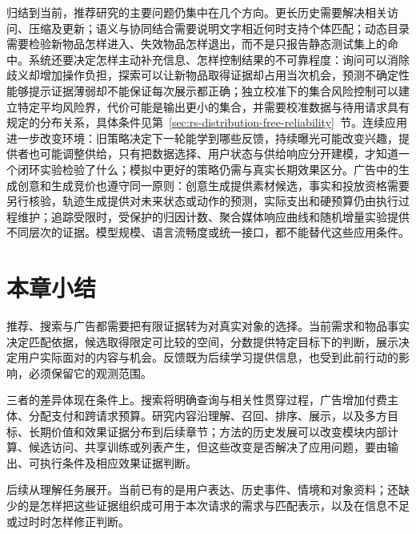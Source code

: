 归结到当前，推荐研究的主要问题仍集中在几个方向。更长历史需要解决相关访问、压缩及更新；语义与协同结合需要说明文字相近何时支持个体匹配；动态目录需要检验新物品怎样进入、失效物品怎样退出，而不是只报告静态测试集上的命中。系统还要决定怎样主动补充信息、怎样控制结果的不可靠程度：询问可以消除歧义却增加操作负担，探索可以让新物品取得证据却占用当次机会，预测不确定性能够提示证据薄弱却不能保证每次展示都正确；独立校准下的集合风险控制可以建立特定平均风险界，代价可能是输出更小的集合，并需要校准数据与待用请求具有规定的分布关系，具体条件见第~\ref{sec:rs-distribution-free-reliability}~节。连续应用进一步改变环境：旧策略决定下一轮能学到哪些反馈，持续曝光可能改变兴趣，提供者也可能调整供给，只有把数据选择、用户状态与供给响应分开建模，才知道一个闭环实验检验了什么；模拟中更好的策略仍需与真实长期效果区分。广告中的生成创意和生成竞价也遵守同一原则：创意生成提供素材候选，事实和投放资格需要另行核验，轨迹生成提供对未来状态或动作的预测，实际支出和硬预算仍由执行过程维护；追踪受限时，受保护的归因计数、聚合媒体响应曲线和随机增量实验提供不同层次的证据。模型规模、语言流畅度或统一接口，都不能替代这些应用条件。

\section{本章小结}
\label{sec:rs-overview-summary}

推荐、搜索与广告都需要把有限证据转为对真实对象的选择。当前需求和物品事实决定匹配依据，候选取得限定可比较的空间，分数提供特定目标下的判断，展示决定用户实际面对的内容与机会。反馈既为后续学习提供信息，也受到此前行动的影响，必须保留它的观测范围。

三者的差异体现在条件上。搜索将明确查询与相关性贯穿过程，广告增加付费主体、分配支付和跨请求预算。研究内容沿理解、召回、排序、展示，以及多方目标、长期价值和效果证据分布到后续章节；方法的历史发展可以改变模块内部计算、候选访问、共享训练或列表产生，但这些改变是否解决了应用问题，要由输出、可执行条件及相应效果证据判断。

后续从理解任务展开。当前已有的是用户表达、历史事件、情境和对象资料；还缺少的是怎样把这些证据组织成可用于本次请求的需求与匹配表示，以及在信息不足或过时时怎样修正判断。
